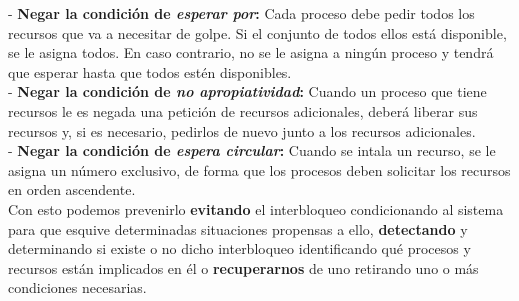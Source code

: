 \documentclass[spanish, 12pt]{article}
\begin{document}
				- \textbf{Negar la condición de \textit{esperar por}:} Cada proceso debe pedir todos los recursos que va a necesitar de golpe. Si el conjunto de todos ellos está disponible, se le asigna todos. En caso contrario, no se le asigna a ningún proceso y tendrá que esperar hasta que todos estén disponibles.\\
				
				- \textbf{Negar la condición de \textit{no apropiatividad}:} Cuando un proceso que tiene recursos le es negada una petición de recursos adicionales, deberá liberar sus recursos y, si es necesario, pedirlos de nuevo junto a los recursos adicionales.\\
				
				- \textbf{Negar la condición de \textit{espera circular}:} Cuando se intala un recurso, se le asigna un número exclusivo, de forma que los procesos deben solicitar los recursos en orden ascendente.\\
				
				Con esto podemos prevenirlo \textbf{evitando} el interbloqueo condicionando al sistema para que esquive determinadas situaciones propensas a ello, \textbf{detectando} y determinando si existe o no dicho interbloqueo identificando qué procesos y recursos están implicados en él o \textbf{recuperarnos} de uno retirando uno o más condiciones necesarias.\\
											
							
\end{document}
